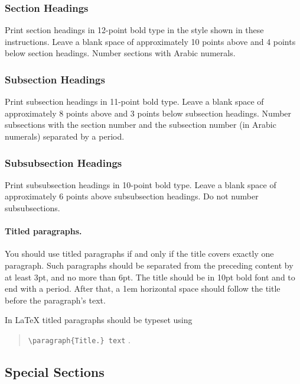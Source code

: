 \documentclass{article}
\begin{document}
\subsubsection{Section Headings}

Print section headings in 12-point bold type in the style shown in
these instructions. Leave a blank space of approximately 10 points
above and 4 points below section headings.  Number sections with
Arabic numerals.

\subsubsection{Subsection Headings}

Print subsection headings in 11-point bold type. Leave a blank space
of approximately 8 points above and 3 points below subsection
headings. Number subsections with the section number and the
subsection number (in Arabic numerals) separated by a
period.

\subsubsection{Subsubsection Headings}

Print subsubsection headings in 10-point bold type. Leave a blank
space of approximately 6 points above subsubsection headings. Do not
number subsubsections.

\paragraph{Titled paragraphs.} You should use titled paragraphs if and
only if the title covers exactly one paragraph. Such paragraphs should be
separated from the preceding content by at least 3pt, and no more than
6pt. The title should be in 10pt bold font and to end with a period.
After that, a 1em horizontal space should follow the title before
the paragraph's text.

In \LaTeX{} titled paragraphs should be typeset using
\begin{quote}
    {\tt \textbackslash{}paragraph\{Title.\} text} .
\end{quote}

\subsection{Special Sections}
\end{document}
